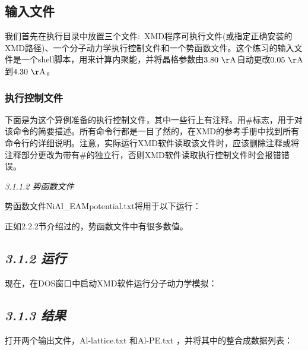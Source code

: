 \subsection{输入文件}\label{ux8f93ux5165ux6587ux4ef6} 
我们首先在执行目录中放置三个文件:~\textrm{XMD}程序可执行文件(或指定正确安装的\textrm{XMD}路径)、一个分子动力学执行控制文件和一个势函数文件。这个练习的输入文件是一个\textrm{shell}脚本，用来计算内聚能，并将晶格参数由$3.80~\mathrm{\AA}$自动更改$0.05~\mathrm{\AA}$到$4.30~\mathrm{\AA}$。

\subsubsection{执行控制文件} 
下面是为这个算例准备的执行控制文件，其中一些行上有注释。用\#标志，用于对该命令的简要描述。所有命令行都是一目了然的，在\textrm{XMD}的参考手册中找到所有命令行的详细说明。注意，实际运行\textrm{XMD}软件读取该文件时，应该删除注释或将注释部分更改为带有\#的独立行，否则XMD软件读取执行控制文件时会报错错误。


\emph{3.1.1.2 势函数文件}

势函数文件NiAl\_EAMpotential.txt将用于以下运行：


正如2.2.2节介绍过的，势函数文件中有很多数值。

\hypertarget{ux8fd0ux884c}{%
\subsection{\texorpdfstring{\emph{3.1.2
运行}}{3.1.2 运行}}\label{ux8fd0ux884c}}

现在，在DOS窗口中启动XMD软件运行分子动力学模拟：


\hypertarget{ux7ed3ux679c}{%
\subsection{\texorpdfstring{\emph{3.1.3
结果}}{3.1.3 结果}}\label{ux7ed3ux679c}}

打开两个输出文件，Al-lattice.txt 和Al-PE.txt
，并将其中的整合成数据列表：


